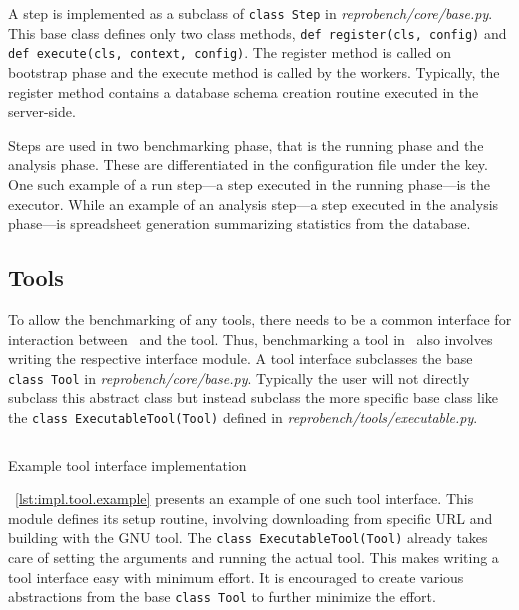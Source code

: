 A step is implemented as a subclass of \texttt{class Step} in \emph{reprobench/core/base.py}.
This base class defines only two class methods, \texttt{def register(cls, config)} and \texttt{def execute(cls, context, config)}.
The register method is called on bootstrap phase and the execute method is called by the workers.
Typically, the register method contains a database schema creation routine executed in the server-side.

Steps are used in two benchmarking phase, that is the running phase and the analysis phase.
These are differentiated in the configuration file under the  key.
One such example of a run step---a step executed in the running phase---is the executor.
While an example of an analysis step---a step executed in the analysis phase---is spreadsheet generation summarizing statistics from the database.

\subsection{Tools}
\label{sec:impl.tools}

To allow the benchmarking of any tools, there needs to be a common interface for interaction between \OurBenchmarkingTool~and the tool.
Thus, benchmarking a tool in \OurBenchmarkingTool~also involves writing the respective interface module.
A tool interface subclasses the base \texttt{class Tool} in \emph{reprobench/core/base.py}.
Typically the user will not directly subclass this abstract class but instead subclass the more specific base class like the \texttt{class ExecutableTool(Tool)} defined in \emph{reprobench/tools/executable.py}.

\begin{listing}
    \inputminted[firstline=12]{python}{assets/listings/reprobench/examples/sat/tools/glucose.py}
    \caption{Example tool interface implementation}
    \label{lst:impl.tool.example}
\end{listing}

\lst~\ref{lst:impl.tool.example} presents an example of one such tool interface.
This module defines its setup routine, involving downloading from specific URL and building with the GNU  tool.
The \texttt{class ExecutableTool(Tool)} already takes care of setting the arguments and running the actual tool.
This makes writing a tool interface easy with minimum effort.
It is encouraged to create various abstractions from the base \texttt{class Tool} to further minimize the effort.

